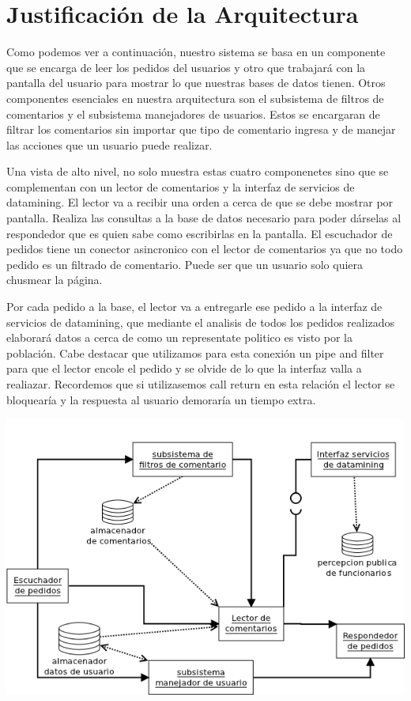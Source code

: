 \section{Justificación de la Arquitectura}

\begin{spacing}{1.5}
Como podemos ver a continuación, nuestro sistema se basa en un componente que se encarga de leer los pedidos del usuarios y otro que trabajará con la pantalla del usuario para mostrar lo que nuestras bases de datos tienen.
Otros componentes esenciales en nuestra arquitectura son el subsistema de filtros de comentarios y el subsistema manejadores de usuarios.
Estos se encargaran de filtrar los comentarios sin importar que tipo de comentario ingresa y de manejar las acciones que un usuario puede realizar.

Una vista de alto nivel, no solo muestra estas cuatro componenetes sino que se complementan con un lector de comentarios y la interfaz de servicios de datamining.
El lector va a recibir una orden a cerca de que se debe mostrar por pantalla.
Realiza las consultas a la base de datos necesario para poder dárselas al respondedor que es quien sabe como escribirlas en la pantalla. 
El escuchador de pedidos tiene un conector asincronico con el lector de comentarios ya que no todo pedido es un filtrado de comentario. Puede ser que un usuario solo quiera chusmear la página.

Por cada pedido a la base, el lector va a entregarle ese pedido a la interfaz de servicios de datamining, que mediante el analisis de todos los pedidos realizados elaborará datos a cerca de como un representate politico es visto por la población. 
Cabe destacar que utilizamos para esta conexión un pipe and filter para que el lector encole el pedido y se olvide de lo que la interfaz valla a realiazar.
Recordemos que si utilizasemos call return en esta relación el lector se bloquearía y la respuesta al usuario demoraría un tiempo extra.
\end{spacing}

\begin{center}
\includegraphics[scale=0.55]{../img/alto_nivel.png}\\
\end{center}

